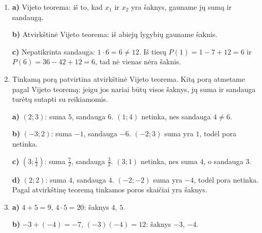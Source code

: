 \documentclass[12pt,a4paper]{article}
\begin{document}
\begin{enumerate}
Kad išnagrinėtume atvejį $u=v$, pirmiausia iš duotų sąlygų, kai $a\ne0$, išreiškiame koeficientus:
\[b=-a(u+v),\qquad c=auv.\]
Įrašę juos į diskriminanto formulę ir atskliaudę gauname
\begin{align*}
D&=b^2-4ac\\
 &=\bigl(-a(u+v)\bigr)^2-4a\cdot auv\\
 &=a^2\bigl((u+v)^2-4uv\bigr)\\
 &=a^2(u^2+2uv+v^2-4uv)\\
 &=a^2(u^2-2uv+v^2)=a^2(u-v)^2.
\end{align*}
Kai $u=v$, gauname $D=0$. Pagal 6 temos išvadą tuomet yra tik viena realioji šaknis; 7 temoje ją vadinome dvigubąja. Abu žymenys $u$ ir $v$ nurodo tą patį skaičių.

\textbf{d)} Pagal 3d punktą $\frac{P(x)}a=(x-u)(x-v)$. Kadangi $a\ne0$, lygybė $P(x)=0$ tenkinama tada ir tik tada, kai $(x-u)(x-v)=0$, t. y. kai $x=u$ arba $x=v$. Jei $u=v$, tai viena šaknis. Tai sutampa su 6 temos išvada, kad kvadratinis daugianaris turi ne daugiau kaip dvi skirtingas realiąsias šaknis.
\item \textbf{a)} Vijeto teorema: iš to, kad $x_1$ ir $x_2$ yra šaknys, gauname jų sumą ir sandaugą.

\textbf{b)} Atvirkštinė Vijeto teorema: iš abiejų lygybių gauname šaknis.

\textbf{c)} Nepatikrinta sandauga: $1\cdot6=6\ne12$. Iš tiesų $P(1)=1-7+12=6$ ir $P(6)=36-42+12=6$, tad nė vienas nėra šaknis.
\item Tinkamą porą patvirtina atvirkštinė Vijeto teorema. Kitą porą atmetame pagal Vijeto teoremą: jeigu jos nariai būtų visos šaknys, jų suma ir sandauga turėtų sutapti su reikiamomis.

\textbf{a)} $(2;3)$: suma $5$, sandauga $6$. $(1;4)$ netinka, nes sandauga $4\ne6$.

\textbf{b)} $(-3;2)$: suma $-1$, sandauga $-6$. $(-2;3)$ suma yra $1$, todėl pora netinka.

\textbf{c)} $(3;\frac{1}{2})$: suma $\frac{7}{2}$, sandauga $\frac{3}{2}$. $(3;1)$ netinka, nes suma $4$, o sandauga $3$.

\textbf{d)} $(2;2)$: suma $4$, sandauga $4$. $(-2;-2)$ suma yra $-4$, todėl pora netinka. Pagal atvirkštinę teoremą tinkamos poros skaičiai yra šaknys.
\item \textbf{a)} $4+5=9$, $4\cdot5=20$: šaknys $4$, $5$.

\textbf{b)} $-3+(-4)=-7$, $(-3)(-4)=12$: šaknys $-3$, $-4$.


\end{enumerate}
\end{document}
